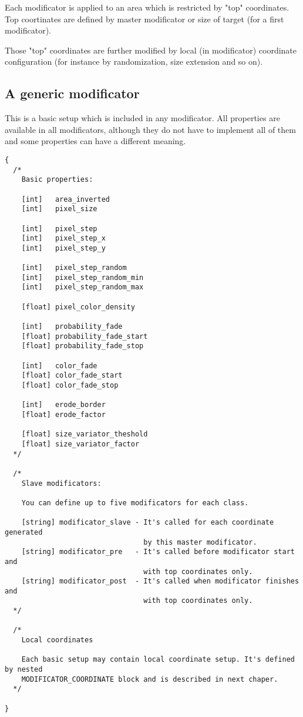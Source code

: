 \documentclass[11pt]{article}
\begin{document}
Each modificator is applied to an area which is restricted by "top" coordinates. 
Top coortinates are defined by master modificator or size of target 
(for a first modificator).

Those "top" coordinates are further modified by local (in modificator) 
coordinate configuration (for instance by randomization, size extension
and so on).

\subsection{A generic modificator}

This is a basic setup which is included in any modificator.
All properties are available in all modificators, 
although they do not have to implement all of them 
and some properties can have a different meaning.

\begin{verbatim}
{
  /*
    Basic properties:
  
    [int]   area_inverted
    [int]   pixel_size
    
    [int]   pixel_step
    [int]   pixel_step_x
    [int]   pixel_step_y
  
    [int]   pixel_step_random
    [int]   pixel_step_random_min
    [int]   pixel_step_random_max
    
    [float] pixel_color_density
    
    [int]   probability_fade
    [float] probability_fade_start
    [float] probability_fade_stop
  
    [int]   color_fade
    [float] color_fade_start
    [float] color_fade_stop
      
    [int]   erode_border
    [float] erode_factor
    
    [float] size_variator_theshold
    [float] size_variator_factor
  */    
    
  /*
    Slave modificators:
    
    You can define up to five modificators for each class.
    
    [string] modificator_slave - It's called for each coordinate generated
                                 by this master modificator.    
    [string] modificator_pre   - It's called before modificator start and
                                 with top coordinates only.
    [string] modificator_post  - It's called when modificator finishes and
                                 with top coordinates only.
  */  

  /*
    Local coordinates
    
    Each basic setup may contain local coordinate setup. It's defined by nested 
    MODIFICATOR_COORDINATE block and is described in next chaper.
  */

}
\end{verbatim}
\end{document}
